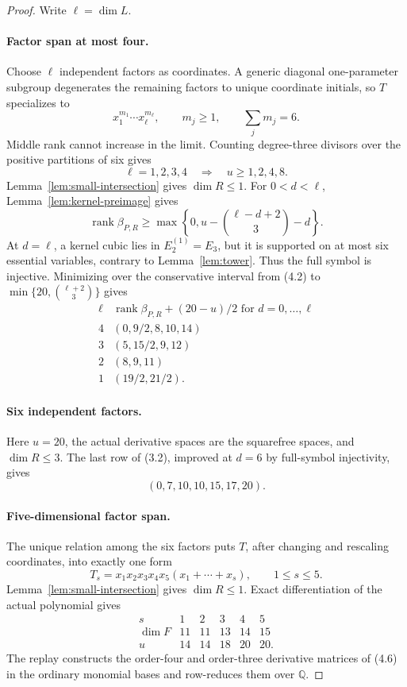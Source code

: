 \documentclass[11pt]{amsart}
\newcommand{\rank}{\operatorname{rank}}
\theoremstyle{definition}
\begin{document}
\begin{proof}
Write \(\ell=\dim L\).

\paragraph{Factor span at most four.}
Choose \(\ell\) independent factors as coordinates. A generic diagonal
one-parameter subgroup degenerates the remaining factors to unique coordinate
initials, so \(T\) specializes to
\[
 x_1^{m_1}\cdots x_\ell^{m_\ell},\qquad m_j\ge1,
 \qquad\sum_jm_j=6.
\]
Middle rank cannot increase in the limit. Counting degree-three divisors over
the positive partitions of six gives
\[
 \ell=1,2,3,4\quad\Longrightarrow\quad u\ge1,2,4,8. \tag{4.2}
\]
Lemma~\ref{lem:small-intersection} gives \(\dim R\le1\). For
\(0<d<\ell\), Lemma~\ref{lem:kernel-preimage} gives
\[
 \rank\beta_{P,R}\ge
 \max\left\{0,u-\binom{\ell-d+2}{3}-d\right\}. \tag{4.3}
\]
At \(d=\ell\), a kernel cubic lies in \(E_2^{(1)}=E_3\), but it is
supported on at most six essential variables, contrary to
Lemma~\ref{lem:tower}. Thus the full symbol is injective. Minimizing over the
conservative interval from (4.2) to
\(\min\{20,\binom{\ell+2}{3}\}\) gives
\[
\begin{array}{c|c}
\ell&\rank\beta_{P,R}+(20-u)/2\text{ for }d=0,\ldots,\ell\\ \hline
4&(0,9/2,8,10,14)\\
3&(5,15/2,9,12)\\
2&(8,9,11)\\
1&(19/2,21/2).
\end{array} \tag{4.4}
\]

\paragraph{Six independent factors.}
Here \(u=20\), the actual derivative spaces are the squarefree spaces, and
\(\dim R\le3\). The last row of (3.2), improved at \(d=6\) by full-symbol
injectivity, gives
\[
 (0,7,10,10,15,17,20). \tag{4.5}
\]

\paragraph{Five-dimensional factor span.}
The unique relation among the six factors puts \(T\), after changing and
rescaling coordinates, into exactly one form
\[
 T_s=x_1x_2x_3x_4x_5(x_1+\cdots+x_s),\qquad1\le s\le5. \tag{4.6}
\]
Lemma~\ref{lem:small-intersection} gives \(\dim R\le1\). Exact
differentiation of the actual polynomial gives
\[
\begin{array}{c|rrrrr}
s&1&2&3&4&5\\ \hline
\dim F&11&11&13&14&15\\
u&14&14&18&20&20.
\end{array} \tag{4.7}
\]
The replay constructs the order-four and order-three derivative matrices of
(4.6) in the ordinary monomial bases and row-reduces them over \(\mathbb Q\).


\end{proof}
\end{document}
